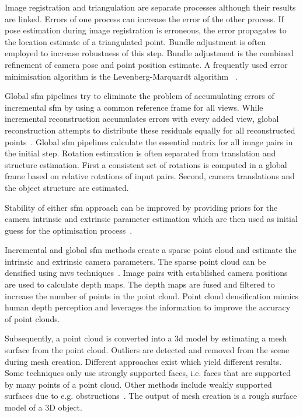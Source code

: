 Image registration and triangulation are separate processes although their results are linked. Errors of one process can increase the error of the other process. If pose estimation during image registration is erroneous, the error propagates to the location estimate of a triangulated point. Bundle adjustment is often employed to increase robustness of this step. Bundle adjustment is the combined refinement of camera pose and point position estimate. A frequently used error minimisation algorithm is the Levenberg-Marquardt algorithm ~\cite{schonberger2016structure, Moulon2013AdaptiveEstimation}.

Global \gls{sfm} pipelines try to eliminate the problem of accumulating errors of incremental \gls{sfm} by using a common reference frame for all views. While incremental reconstruction accumulates errors with every added view, global reconstruction attempts to distribute these residuals equally for all reconstructed points~\cite{Moulon2013GlobalMotion}. Global \gls{sfm} pipelines calculate the essential matrix for all image pairs in the initial step. Rotation estimation is often separated from translation and structure estimation. First a consistent set of rotations is computed in a global frame based on relative rotations of input pairs. Second, camera translations and the object structure are estimated.

Stability of either \gls{sfm} approach can be improved by providing priors for the camera intrinsic and extrinsic parameter estimation which are then used as initial guess for the optimisation process~\cite{Irschara2011EfficientPriors}.

Incremental and global \gls{sfm} methods create a sparse point cloud and estimate the intrinsic and extrinsic camera parameters. The sparse point cloud can be densified using \gls{mvs} techniques~\cite{Pagani2011DenseImages}. Image pairs with established camera positions are used to calculate depth maps. The depth maps are fused and filtered to increase the number of points in the point cloud. Point cloud densification mimics human depth perception and leverages the information to improve the accuracy of point clouds.

Subsequently, a point cloud is converted into a \gls{3d} model by estimating a mesh surface from the point cloud. Outliers are detected and removed from the scene during mesh creation. Different approaches exist which yield different results. Some techniques only use strongly supported faces, i.e. faces that are supported by many points of a point cloud. Other methods include weakly supported surfaces due to e.g. obstructions~\cite{Jancosek2014ExploitingSurfaces}. The output of mesh creation is a rough surface model of a 3D object.

